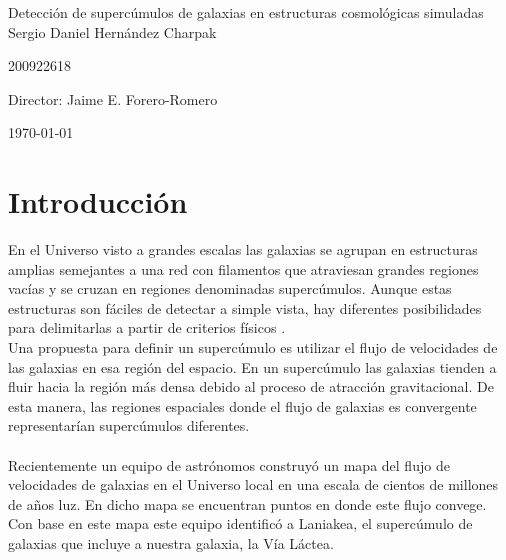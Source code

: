 \documentclass[12pt]{article}
\begin{document}
\begin{center}
\Huge
Detecci\'on de superc\'{u}mulos de galaxias en estructuras
cosmol\'{o}gicas simuladas\\  
\vspace{3mm}
\Large Sergio Daniel Hern\'{a}ndez Charpak

\large
200922618

\vspace{2mm}
\Large
Director: Jaime E. Forero-Romero

\normalsize
\vspace{2mm}

\today
\end{center}


\normalsize
\section{Introducci\'{o}n}
En el Universo visto a grandes escalas las galaxias se agrupan en
estructuras amplias semejantes a una red con filamentos que atraviesan
grandes regiones vac\'ias y se cruzan en regiones denominadas superc\'{u}mulos.
Aunque estas estructuras son f\'aciles de detectar a simple vista, hay
diferentes posibilidades para delimitarlas a partir de criterios
f\'isicos \cite{gott_iii_map_2005}.    
\\

Una propuesta para definir un superc\'umulo es utilizar el flujo de
velocidades de las galaxias en esa regi\'on del espacio.
En un superc\'umulo las galaxias tienden a fluir hacia la regi\'on
m\'as densa debido al proceso de atracci\'on gravitacional.
De esta manera, las regiones espaciales donde el flujo de galaxias es
convergente  representar\'ian superc\'umulos diferentes.\\
\\
Recientemente un equipo de astr\'{o}nomos construy\'o un mapa del flujo
de velocidades de galaxias en el Universo local en una escala de
cientos de millones de a\~nos luz\cite{tully_cosmicflows-2_2013}. 
En dicho mapa se encuentran puntos en donde este flujo convege. 
Con base en este mapa este equipo identific\'{o} a Laniakea, el
superc\'umulo de galaxias que incluye a nuestra galaxia, la V\'ia
L\'{a}ctea\cite{tully_laniakea_2014}. 
\\   
\end{document}
